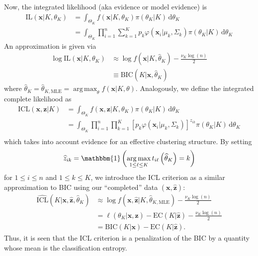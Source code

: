 \documentclass{uwstat572}
\newcommand*\ba{\[ \begin{aligned}}
\newcommand*\ea{\end{aligned} \]}
\newcommand*\ind[1]{\mathbbm{1}\left(#1\right)}
\newcommand*\estim[1]{\widehat{#1}}
\newcommand*\der{\text{d}}
\newcommand*\bx{\mathbf{x}}
\newcommand*\bz{\mathbf{z}}
\DeclareMathOperator*{\argmax}{arg\;max}
\renewcommand\;{\,}
\renewcommand\phi{\varphi}
\begin{document}
Now, the integrated likelihood (aka evidence or model evidence) is
\ba
\text{IL}(\bx | K, \theta_K)
	& = \int_{\Theta_{K}} f(\bx | K, \theta_K) \pi(\theta_K | K) \; \der \theta_K \\
	& = \int_{\Theta_{K}} \prod_{i=1}^n \sum_{k=1}^K p_k \phi(\bx_i | \mu_k, \Sigma_k) \pi(\theta_K | K) \; \der \theta_K
\ea
An approximation is given via
\ba
	\log \text{IL}(\bx | K, \theta_K) 
		& \approx \log f\left(\bx | K, \estim\theta_{K}\right)
		 - \frac{\nu_K \log(n)}{2} \\
		& \equiv \text{BIC}\left(K|\bx, \estim\theta_K \right)
\ea
where $\estim\theta_K = \estim\theta_{K, \text{MLE}} = \argmax_\theta f(\bx | K, \theta)$. 
Analogously, we define the integrated complete likelihood as
\ba
\text{ICL}(\bx, \bz | K)
	& = \int_{\Theta_K} f(\bx, \bz | K, \theta_K) \pi(\theta_K | K) \; \der \theta_K \\
	& = \int_{\Theta_K} \prod_{i=1}^n \prod_{k = 1}^K 
		\left[ p_k \phi(\bx_i | \mu_k, \Sigma_k) \right]^{z_{ik}} \pi(\theta_K | K) \; \der \theta_K \\
\ea
which takes into account evidence for an effective clustering structure. 
By setting
\ba
\estim z_{ik} = \ind{ \argmax_{1 \le \ell \le K} t_{i \ell}\left(\estim\theta_{K}\right) = k }
\ea
for $1 \le i \le n$ and $1 \le k \le K$,
we introduce the ICL criterion as a similar approximation to BIC using our ``completed'' data $(\bx, \estim\bz)$:
\ba
 \estim{\text{ICL}}\left(K|\bx, \estim\bz, \estim\theta_K\right) 
	& \approx 
	\log f\left(\bx, \estim\bz | K, \estim\theta_{K, \text{MLE}}\right) - 
		\frac{ \nu_K \log(n) }{2} \\
	& = \ell \left(\theta_K | \bx, \estim\bz \right) 
		- \text{EC}\left(K|\estim\bz\right) 
		- \frac{ \nu_K \log(n) }{2} \\
	& = \text{BIC}(K|\bx) - \text{EC}\left(K|\estim\bz\right).
\ea
Thus, it is seen that the ICL criterion is a penalization of the BIC by a quantity whose mean is the classification entropy.
\end{document}
